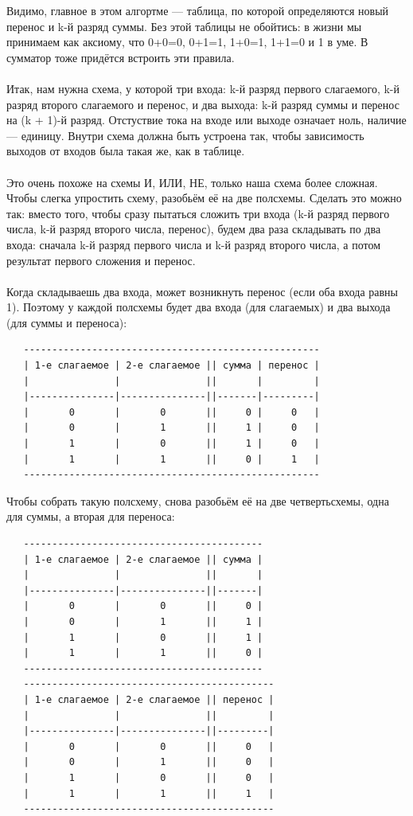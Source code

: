\documentclass[11pt]{book}
\begin{document}
Видимо, главное в этом алгортме --- таблица, по которой определяются новый перенос
и k-й разряд суммы. Без этой таблицы не обойтись: в жизни мы принимаем как аксиому,
что 0+0=0, 0+1=1, 1+0=1, 1+1=0 и 1 в уме. В сумматор тоже придётся встроить эти
правила.
\\ \\
Итак, нам нужна схема, у которой три входа: k-й разряд первого слагаемого,
k-й разряд второго слагаемого и перенос, и два выхода: k-й разряд суммы и перенос
на (k + 1)-й разряд. Отстуствие тока на входе или выходе означает ноль,
наличие --- единицу. Внутри схема должна быть устроена так, чтобы зависимость
выходов от входов была такая же, как в таблице.
\\ \\
Это очень похоже на схемы И, ИЛИ, НЕ, только наша схема более сложная.
Чтобы слегка упростить схему, разобьём её на две полсхемы. Сделать это
можно так: вместо того, чтобы сразу пытаться сложить три входа
(k-й разряд первого числа, k-й разряд второго числа, перенос), будем
два раза складывать по два входа: сначала k-й разряд первого числа и k-й разряд второго числа,
а потом результат первого сложения и перенос.
\\ \\
Когда складываешь два входа, может возникнуть перенос (если оба входа равны 1).
Поэтому у каждой полсхемы будет два входа (для слагаемых) и два выхода
(для суммы и переноса):
\begin{verbatim}
   ----------------------------------------------------
   | 1-е слагаемое | 2-е слагаемое || сумма | перенос |
   |               |               ||       |         |
   |---------------|---------------||-------|---------|
   |       0       |       0       ||     0 |     0   |
   |       0       |       1       ||     1 |     0   |
   |       1       |       0       ||     1 |     0   |
   |       1       |       1       ||     0 |     1   |
   ----------------------------------------------------
\end{verbatim}
Чтобы собрать такую полсхему, снова разобьём её на две четвертьсхемы,
одна для суммы, а вторая для переноса:
\begin{verbatim}
   ------------------------------------------
   | 1-е слагаемое | 2-е слагаемое || сумма |
   |               |               ||       |
   |---------------|---------------||-------|
   |       0       |       0       ||     0 |
   |       0       |       1       ||     1 |
   |       1       |       0       ||     1 |
   |       1       |       1       ||     0 |
   ------------------------------------------
   --------------------------------------------
   | 1-е слагаемое | 2-е слагаемое || перенос |
   |               |               ||         |
   |---------------|---------------||---------|
   |       0       |       0       ||     0   |
   |       0       |       1       ||     0   |
   |       1       |       0       ||     0   |
   |       1       |       1       ||     1   |
   --------------------------------------------
\end{verbatim}
\end{document}

